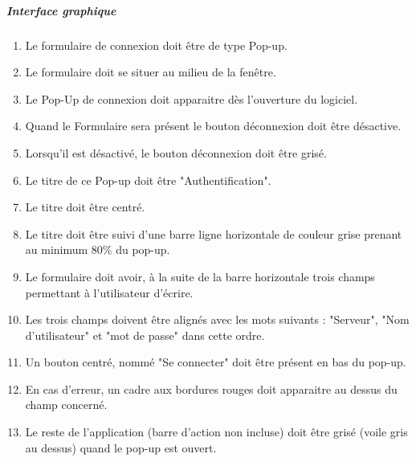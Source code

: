 \documentclass[10pt,a4paper]{report}
\begin{document}
	\subparagraph{Interface graphique}\label{ClientIGA} 
	\begin{enumerate}
		\item Le formulaire de connexion doit être de type Pop-up.
		\item Le formulaire doit se situer au milieu de la fenêtre.
		\item Le Pop-Up de connexion doit apparaitre dès l'ouverture du logiciel.
		\item Quand le Formulaire sera présent le bouton déconnexion doit être désactive.
		\item Lorsqu'il est désactivé, le bouton déconnexion doit être grisé.
		\item Le titre de ce Pop-up doit être "Authentification".
		\item Le titre doit être centré.
		\item Le titre doit être suivi d'une barre ligne horizontale de couleur grise prenant au minimum 80\% du pop-up.
		\item Le formulaire doit avoir, à la suite de la barre horizontale trois champs permettant à l'utilisateur d'écrire.
		\item Les trois champs doivent être alignés avec les mots suivants : "Serveur", "Nom d'utilisateur" et "mot de passe" dans cette ordre.
		\item Un bouton centré, nommé "Se connecter" doit être présent en bas du pop-up.
		\item En cas d'erreur, un cadre aux bordures rouges doit apparaitre au dessus du champ concerné.
		\item Le reste de l'application (barre d'action non incluse) doit être grisé (voile gris au dessus) quand le pop-up est ouvert.
	\end{enumerate}
	
\end{document}
